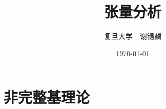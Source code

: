 \documentclass[oneside]{book}
\title{张量分析}
\author{复旦大学　谢锡麟} %
\date{\today}
\theoremstyle{nonumberplain} %
\begin{document}
%	
%	
%		
%	
%		
%	
%		
%	
%		
%	
	\chapter{非完整基理论}
		
%	
%		
%	
\end{document}
